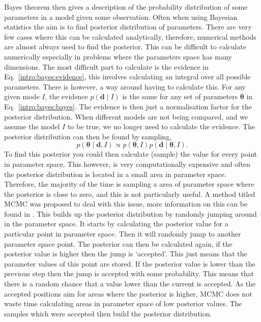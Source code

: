 Bayes theorem then gives a description of the probability distribution of some parameters in a model given some observation.
Often when using Bayesian statistics the aim is to find posterior distribution of parameters.
There are very few cases where this can be calculated analytically, therefore, numerical methods are almost always used to find the posterior.
This can be difficult to calculate numerically especially in problems where the parameters space has many dimensions.
The most difficult part to calculate is the evidence in Eq.~\ref{intro:bayes:evidence}, this involves calculating an integral over all possible parameters.
There is however, a way around having to calculate this. For any given mode $I$, the evidence $p({\bm d}\mid I)$ is the same for any set of parameters ${\bm \theta}$ in Eq.~\ref{intro:bayes:bayes}. 
The evidence is then just a normalisation factor for the posterior distribution. 
When different models are not being compared, and we assume the model $I$ to be true, we no longer need to calculate the evidence.
The posterior distribution can then be found by sampling,
\begin{equation}
p({\bm \theta} \mid {\bm d}, I) \propto p({\bm \theta}, I)p({\bm d} \mid {\bm \theta}, I).
\end{equation}
To find this posterior you could then calculate (sample) the value for every point in parameter space. This however, is very computationally expensive and often the posterior distribution is located in a small area in parameter space. 
Therefore, the majority of the time is sampling a area of parameter space where the posterior is close to zero, and this is not particularly useful. 
A method titled \gls{MCMC} was proposed \citep{metropolis1953EquationState} to deal with this issue, more information on this can be found in \citep{vanravenzwaaij2018SimpleIntroduction,sharma2017MarkovChain}.
This builds up the posterior distribution by randomly jumping around in the parameter space.
It starts by calculating the posterior value for a particular point in parameter space. Then it will randomly jump to another parameter space point. 
The posterior can then be calculated again, if the posterior value is higher then the jump is `accepted'. This just means that the parameter values of this point are stored.
If the posterior value is lower than the previous step then the jump is accepted with some probability. This means that there is a random chance that a value lower than the current is accepted.
As the accepted positions aim for areas where the posterior is higher, \gls{MCMC} does not waste time calculating areas in parameter space of low posterior values.
The samples which were accepted then build the posterior distribution. 


